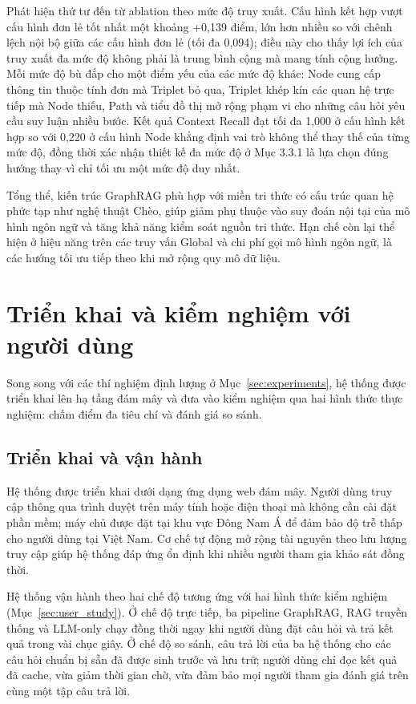 Phát hiện thứ tư đến từ ablation theo mức độ truy xuất. Cấu hình kết hợp vượt cấu hình đơn lẻ tốt nhất một khoảng +0,139 điểm, lớn hơn nhiều so với chênh lệch nội bộ giữa các cấu hình đơn lẻ (tối đa 0,094); điều này cho thấy lợi ích của truy xuất đa mức độ không phải là trung bình cộng mà mang tính cộng hưởng. Mỗi mức độ bù đắp cho một điểm yếu của các mức độ khác: Node cung cấp thông tin thuộc tính đơn mà Triplet bỏ qua, Triplet khép kín các quan hệ trực tiếp mà Node thiếu, Path và tiểu đồ thị mở rộng phạm vi cho những câu hỏi yêu cầu suy luận nhiều bước. Kết quả Context Recall đạt tối đa 1,000 ở cấu hình kết hợp so với 0,220 ở cấu hình Node khẳng định vai trò không thể thay thế của từng mức độ, đồng thời xác nhận thiết kế đa mức độ ở Mục 3.3.1 là lựa chọn đúng hướng thay vì chỉ tối ưu một mức độ duy nhất.

Tổng thể, kiến trúc GraphRAG phù hợp với miền tri thức có cấu trúc quan hệ phức tạp như nghệ thuật Chèo, giúp giảm phụ thuộc vào suy đoán nội tại của mô hình ngôn ngữ và tăng khả năng kiểm soát nguồn tri thức. Hạn chế còn lại thể hiện ở hiệu năng trên các truy vấn Global và chi phí gọi mô hình ngôn ngữ, là các hướng tối ưu tiếp theo khi mở rộng quy mô dữ liệu.

\section{Triển khai và kiểm nghiệm với người dùng}
\label{sec:user_deployment}

Song song với các thí nghiệm định lượng ở Mục~\ref{sec:experiments}, hệ thống được triển khai lên hạ tầng đám mây và đưa vào kiểm nghiệm qua hai hình thức thực nghiệm: chấm điểm đa tiêu chí và đánh giá so sánh.

\subsection{Triển khai và vận hành}

Hệ thống được triển khai dưới dạng ứng dụng web đám mây. Người dùng truy cập thông qua trình duyệt trên máy tính hoặc điện thoại mà không cần cài đặt phần mềm; máy chủ được đặt tại khu vực Đông Nam Á để đảm bảo độ trễ thấp cho người dùng tại Việt Nam. Cơ chế tự động mở rộng tài nguyên theo lưu lượng truy cập giúp hệ thống đáp ứng ổn định khi nhiều người tham gia khảo sát đồng thời.

Hệ thống vận hành theo hai chế độ tương ứng với hai hình thức kiểm nghiệm (Mục~\ref{sec:user_study}). Ở chế độ trực tiếp, ba pipeline GraphRAG, RAG truyền thống và LLM-only chạy đồng thời ngay khi người dùng đặt câu hỏi và trả kết quả trong vài chục giây. Ở chế độ so sánh, câu trả lời của ba hệ thống cho các câu hỏi chuẩn bị sẵn đã được sinh trước và lưu trữ; người dùng chỉ đọc kết quả đã cache, vừa giảm thời gian chờ, vừa đảm bảo mọi người tham gia đánh giá trên cùng một tập câu trả lời.

